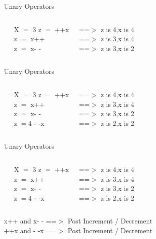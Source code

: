 \documentclass[aspectratio=169,14pt,usenames,dvipsnames]{beamer}
\begin{document}
\begin{frame}{Unary Operators}
\begin{columns}
\\
\begin{block}{X $=$ 3}
z $=$ ++x\\
z $=$ x++\\
z $=$ x- -\\
\end{block}
==$>$ z is 4,x is 4\\
==$>$ z is 3,x is 4\\
==$>$ z is 3,x is 2\\
\end{columns}
\end{frame}

\begin{frame}{Unary Operators}
\begin{columns}
\\
\begin{block}{X $=$ 3}
z $=$ ++x\\
z $=$ x++\\
z $=$ x- -\\
z $=4$ - -x
\end{block}
==$>$ z is 4,x is 4\\
==$>$ z is 3,x is 4\\
==$>$ z is 3,x is 2\\
==$>$ z is 2,x is 2\\
\end{columns}
\end{frame}

\begin{frame}{Unary Operators}
\begin{columns}
\\
\begin{block}{X $=$ 3}
z $=$ ++x\\
z $=$ x++\\
z $=$ x- -\\
z $=4$ - -x
\end{block}
==$>$ z is 4,x is 4\\
==$>$ z is 3,x is 4\\
==$>$ z is 3,x is 2\\
==$>$ z is 2,x is 2\\
\end{columns}
\color{red}x++ and x- - ==$>$ Post Increment / Decrement\\
\color{red}++x and - -x ==$>$ Post Increment / Decrement\\
\end{frame}
\end{document}
